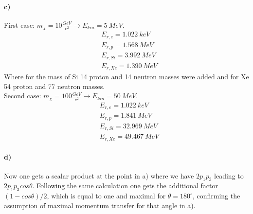 \documentclass[10pt,a4paper]{article}
\begin{document}
\paragraph{c)}
First case: $m_\chi = 10 \frac{GeV}{c^2} \rightarrow E_{kin} = 5\ MeV$.
\begin{align*}
&E_{r, e} = 1.022\ keV \\
&E_{r, p} = 1.568\ MeV \\
&E_{r, Si} = 3.992\ MeV \\
&E_{r, Xe} = 1.390\ MeV 
\end{align*} 
Where for the mass of Si 14 proton and 14 neutron masses were added and for Xe 54 proton and 77 neutron masses.\\
Second case: $m_\chi = 100 \frac{GeV}{c^2} \rightarrow E_{kin} = 50\ MeV$.
\begin{align*}
&E_{r, e} = 1.022\ keV \\
&E_{r, p} = 1.841\ MeV \\
&E_{r, Si} = 32.969\ MeV \\
&E_{r, Xe} = 49.467\ MeV 
\end{align*} 

\paragraph{d)}
Now one gets a scalar product at the point in a) where we have $2p_1p_3$ leading to $2p_1p_3 cos \theta$. Following the same calculation one gets the additional factor $(1 - cos \theta) / 2$, which is equal to one and maximal for $\theta = 180^\circ$, confirming the assumption of maximal momentum transfer for that angle in a).
\end{document}

